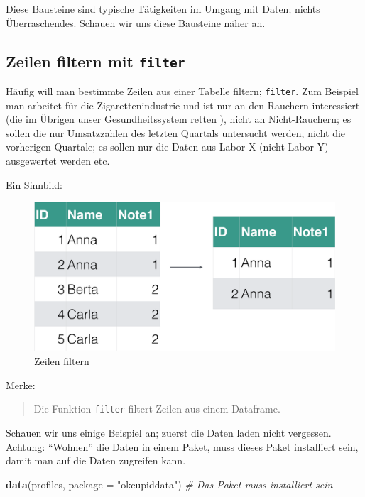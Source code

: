 \documentclass[12pt,ngerman,]{book}
\newenvironment{Shaded}{\begin{snugshade}}{\end{snugshade}}
\newcommand{\KeywordTok}[1]{\textcolor[rgb]{0.13,0.29,0.53}{\textbf{{#1}}}}
\newcommand{\DataTypeTok}[1]{\textcolor[rgb]{0.13,0.29,0.53}{{#1}}}
\newcommand{\StringTok}[1]{\textcolor[rgb]{0.31,0.60,0.02}{{#1}}}
\newcommand{\CommentTok}[1]{\textcolor[rgb]{0.56,0.35,0.01}{\textit{{#1}}}}
\newcommand{\NormalTok}[1]{{#1}}
\renewenvironment{Shaded}{\begin{kframe}}{\end{kframe}}
\begin{document}
Diese Bausteine sind typische Tätigkeiten im Umgang mit Daten; nichts
Überraschendes. Schauen wir uns diese Bausteine näher an.

\subsection{\texorpdfstring{Zeilen filtern mit
\texttt{filter}}{Zeilen filtern mit filter}}\label{zeilen-filtern-mit-filter}

Häufig will man bestimmte Zeilen aus einer Tabelle filtern;
\texttt{filter}. Zum Beispiel man arbeitet für die
Zigarettenindustrie und ist nur an den Rauchern interessiert (die im
Übrigen unser Gesundheitssystem retten \citep{kraemer2011wir}), nicht an
Nicht-Rauchern; es sollen die nur Umsatzzahlen des letzten Quartals
untersucht werden, nicht die vorherigen Quartale; es sollen nur die
Daten aus Labor X (nicht Labor Y) ausgewertet werden etc.

Ein Sinnbild:

\begin{figure}

{\centering \includegraphics[width=0.7\linewidth]{images/Datenjudo/filter} 

}

\caption{Zeilen filtern}\label{fig:fig-filter}
\end{figure}

Merke:

\begin{quote}
Die Funktion \texttt{filter} filtert Zeilen aus einem Dataframe.
\end{quote}

Schauen wir uns einige Beispiel an; zuerst die Daten laden nicht
vergessen. Achtung: ``Wohnen'' die Daten in einem Paket, muss dieses
Paket installiert sein, damit man auf die Daten zugreifen kann.

\begin{Shaded}
\begin{Highlighting}[]
\KeywordTok{data}\NormalTok{(profiles, }\DataTypeTok{package =} \StringTok{"okcupiddata"}\NormalTok{)  }\CommentTok{# Das Paket muss installiert sein}
\end{Highlighting}
\end{Shaded}
\end{document}

